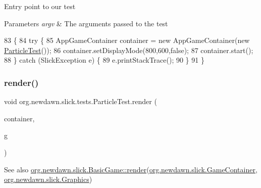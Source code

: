 Entry point to our test


\begin{DoxyParams}{Parameters}
{\em argv} & The arguments passed to the test \\
\hline
\end{DoxyParams}

\begin{DoxyCode}
83                                            \{
84         \textcolor{keywordflow}{try} \{
85             AppGameContainer container = \textcolor{keyword}{new} AppGameContainer(\textcolor{keyword}{new} \mbox{\hyperlink{classorg_1_1newdawn_1_1slick_1_1tests_1_1_particle_test_a0fcfc9b3093b3b35f8935b27c633c1d6}{ParticleTest}}());
86             container.setDisplayMode(800,600,\textcolor{keyword}{false});
87             container.start();
88         \} \textcolor{keywordflow}{catch} (SlickException e) \{
89             e.printStackTrace();
90         \}
91     \}
\end{DoxyCode}
\mbox{\label{classorg_1_1newdawn_1_1slick_1_1tests_1_1_particle_test_aa5357077723958b711b7ff75eb3f5479}} 
\subsubsection{\texorpdfstring{render()}{render()}}
{\footnotesize\ttfamily void org.\+newdawn.\+slick.\+tests.\+Particle\+Test.\+render (\begin{DoxyParamCaption}\item[{\mbox{\hyperlink{classorg_1_1newdawn_1_1slick_1_1_game_container}{Game\+Container}}}]{container,  }\item[{\mbox{\hyperlink{classorg_1_1newdawn_1_1slick_1_1_graphics}{Graphics}}}]{g }\end{DoxyParamCaption})\hspace{0.3cm}{\ttfamily [inline]}}

\begin{DoxySeeAlso}{See also}
\mbox{\hyperlink{interfaceorg_1_1newdawn_1_1slick_1_1_game_af1a4670d43eb3ba04dfcf55ab1975b64}{org.\+newdawn.\+slick.\+Basic\+Game\+::render}}(\mbox{\hyperlink{classorg_1_1newdawn_1_1slick_1_1_game_container}{org.\+newdawn.\+slick.\+Game\+Container}}, \mbox{\hyperlink{classorg_1_1newdawn_1_1slick_1_1_graphics}{org.\+newdawn.\+slick.\+Graphics}}) 
\end{DoxySeeAlso}


